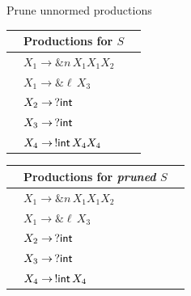 \documentclass[10pt]{beamer}
\begin{document}
\begin{frame} {Prune unnormed productions}
	\vspace*{-2mm}
	\hspace*{5mm}\begin{tabular}{l l l }
 		&Productions for $S$&  \\ \hline
 	 	&$X_1 \rightarrow \& n\, X_1 X_1 X_2$ &\\
 	 	&$X_1 \rightarrow \& \ell\, X_3$ &\\
 	 	&$X_2 \rightarrow \,? \mathsf{int}$&\\
 	 	&$X_3 \rightarrow \,? \mathsf{int}$&\\
 	 	&$X_4 \rightarrow \,!\mathsf{int}\, X_4 X_4$ &\\
	\end{tabular}
	\hspace*{1cm} \pause
	\begin{tabular}{l l l }
 		&Productions for \emph{pruned} $S$&  \\ \hline
  		&\hspace*{4mm}$X_1 \rightarrow \& n\, X_1 X_1 X_2$ & \\
  		&\hspace*{4mm}$X_1 \rightarrow \& \ell\, X_3$ &\\
 		&\hspace*{4mm}$X_2 \rightarrow \,? \mathsf{int}$&\\
  		&\hspace*{4mm}$X_3 \rightarrow \,? \mathsf{int}$&\\
  		&\hspace*{4mm}$X_4 \rightarrow \,!\mathsf{int}\, X_4 $ &\\
	\end{tabular}
 	\vspace*{2mm}
\end{frame}
\end{document}
